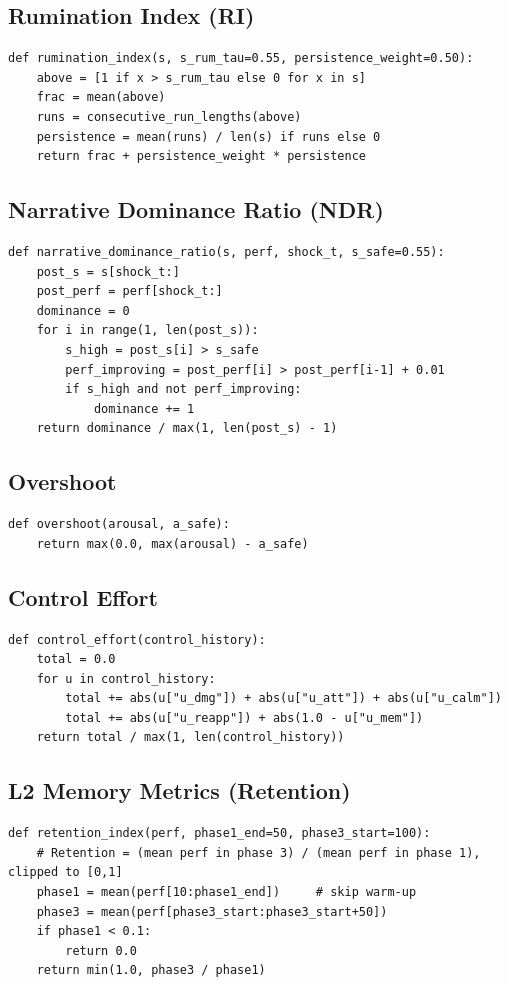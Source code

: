 \documentclass{article}
\begin{document}
\subsection{Rumination Index (RI)}
\begin{verbatim}
def rumination_index(s, s_rum_tau=0.55, persistence_weight=0.50):
    above = [1 if x > s_rum_tau else 0 for x in s]
    frac = mean(above)
    runs = consecutive_run_lengths(above)
    persistence = mean(runs) / len(s) if runs else 0
    return frac + persistence_weight * persistence
\end{verbatim}

\subsection{Narrative Dominance Ratio (NDR)}
\begin{verbatim}
def narrative_dominance_ratio(s, perf, shock_t, s_safe=0.55):
    post_s = s[shock_t:]
    post_perf = perf[shock_t:]
    dominance = 0
    for i in range(1, len(post_s)):
        s_high = post_s[i] > s_safe
        perf_improving = post_perf[i] > post_perf[i-1] + 0.01
        if s_high and not perf_improving:
            dominance += 1
    return dominance / max(1, len(post_s) - 1)
\end{verbatim}

\subsection{Overshoot}
\begin{verbatim}
def overshoot(arousal, a_safe):
    return max(0.0, max(arousal) - a_safe)
\end{verbatim}

\subsection{Control Effort}
\begin{verbatim}
def control_effort(control_history):
    total = 0.0
    for u in control_history:
        total += abs(u["u_dmg"]) + abs(u["u_att"]) + abs(u["u_calm"])
        total += abs(u["u_reapp"]) + abs(1.0 - u["u_mem"])
    return total / max(1, len(control_history))
\end{verbatim}

\subsection{L2 Memory Metrics (Retention)}
\begin{verbatim}
def retention_index(perf, phase1_end=50, phase3_start=100):
    # Retention = (mean perf in phase 3) / (mean perf in phase 1), clipped to [0,1]
    phase1 = mean(perf[10:phase1_end])     # skip warm-up
    phase3 = mean(perf[phase3_start:phase3_start+50])
    if phase1 < 0.1:
        return 0.0
    return min(1.0, phase3 / phase1)
\end{verbatim}
\end{document}
